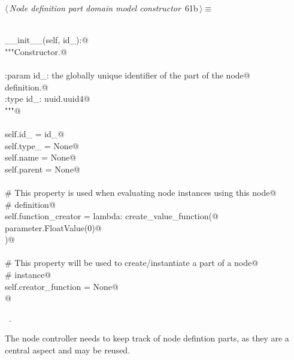 \documentclass[
    a4paper,      %
    10pt,         %
    openright,    %
    notitlepage,  %
    parskip=half, %
]{scrreprt}       %
\theoremstyle{definition}                    %
\begin{document}
\begin{flushleft} \small
\begin{minipage}{\linewidth}\label{scrap101}\raggedright\small
{} $\langle\,${\itshape Node definition part domain model constructor}\nobreak\ {\footnotesize {61b}}$\,\rangle\equiv$
\vspace{-1exm}
\begin{list}{}{} \item
\mbox{}\lstinline@@\\
\mbox{}\lstinline@def __init__(self, id_):@\\
\mbox{}\lstinline@    """Constructor.@\\
\mbox{}\lstinline@@\\
\mbox{}\lstinline@    :param id_: the globally unique identifier of the part of the node@\\
\mbox{}\lstinline@                definition.@\\
\mbox{}\lstinline@    :type  id_: uuid.uuid4@\\
\mbox{}\lstinline@    """@\\
\mbox{}\lstinline@@\\
\mbox{}\lstinline@    self.id_    = id_@\\
\mbox{}\lstinline@    self.type_  = None@\\
\mbox{}\lstinline@    self.name   = None@\\
\mbox{}\lstinline@    self.parent = None@\\
\mbox{}\lstinline@@\\
\mbox{}\lstinline@    # This property is used when evaluating node instances using this node@\\
\mbox{}\lstinline@    # definition@\\
\mbox{}\lstinline@    self.function_creator = lambda: create_value_function(@\\
\mbox{}\lstinline@        parameter.FloatValue(0)@\\
\mbox{}\lstinline@    )@\\
\mbox{}\lstinline@@\\
\mbox{}\lstinline@    # This property will be used to create/instantiate a part of a node@\\
\mbox{}\lstinline@    # instance@\\
\mbox{}\lstinline@    self.creator_function = None@\\
\mbox{}\lstinline@    @{\NWsep}
\end{list}
\vspace{-1.5ex}
\footnotesize
\begin{list}{}{\setlength{\itemsep}{-\parsep}\setlength{\itemindent}{-\leftmargin}}
\item \NWtxtMacroRefIn\ .

\item{}
\end{list}
\end{minipage}\vspace{4ex}
\end{flushleft}
The node controller needs to keep track of node defintion parts, as they are a
central aspect and may be reused.
\end{document}
